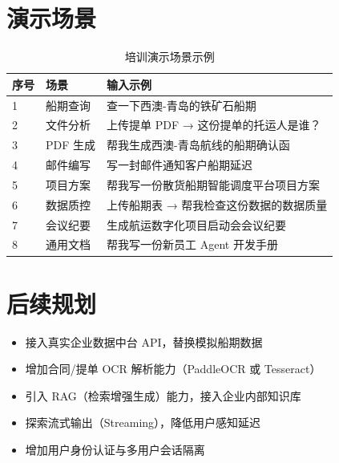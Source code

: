 \documentclass[12pt,a4paper]{ctexart}
\begin{document}
\section{演示场景}

\begin{table}[h]
\centering
\begin{tabular}{|l|l|p{6cm}|}
\hline
\textbf{序号} & \textbf{场景}              & \textbf{输入示例}                              \\ \hline
1  & 船期查询     & 查一下西澳-青岛的铁矿石船期                      \\ \hline
2  & 文件分析     & 上传提单 PDF → 这份提单的托运人是谁？            \\ \hline
3  & PDF 生成     & 帮我生成西澳-青岛航线的船期确认函                 \\ \hline
4  & 邮件编写     & 写一封邮件通知客户船期延迟                        \\ \hline
5  & 项目方案     & 帮我写一份散货船期智能调度平台项目方案             \\ \hline
6  & 数据质控     & 上传船期表 → 帮我检查这份数据的数据质量            \\ \hline
7  & 会议纪要     & 生成航运数字化项目启动会会议纪要                   \\ \hline
8  & 通用文档     & 帮我写一份新员工 Agent 开发手册                   \\ \hline
\end{tabular}
\caption{培训演示场景示例}
\end{table}

\section{后续规划}

\begin{itemize}[leftmargin=*]
    \item 接入真实企业数据中台 API，替换模拟船期数据
    \item 增加合同/提单 OCR 解析能力（PaddleOCR 或 Tesseract）
    \item 引入 RAG（检索增强生成）能力，接入企业内部知识库
    \item 探索流式输出（Streaming），降低用户感知延迟
    \item 增加用户身份认证与多用户会话隔离
\end{itemize}
\end{document}
